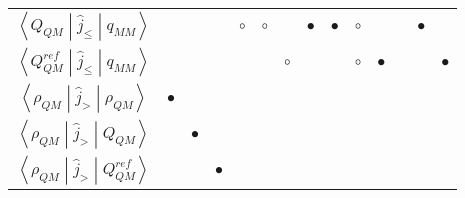 \documentclass{article}
\begin{document}
\begin{table}[tbp]
\begin{threeparttable}
\begin{tabular}{cccccccccccccc}
\rowcolor{Gray}
$\left< Q_{QM} \middle| \hat{j}_{\leq} \middle| q_{MM} \right>$           &                     &                        &                                     & $\circ$                                                                                                                  & $\circ$                &                                     & $\bullet$                                         & $\bullet$              & $\circ$            &                   &                      & $\bullet$         &                  \\
\rowcolor{Gray}
$\left< Q_{QM}^{ref} \middle| \hat{j}_{\leq} \middle| q_{MM} \right>$     &                     &                        &                                     &                                                                                                                          &                        & $\circ$                             &                                                   &                        & $\circ$            & $\bullet$         &                      &                   & $\bullet$        \\
$\left< \rho_{QM} \middle| \hat{j}_{>} \middle| \rho_{QM} \right>$        & $\bullet$           &                        &                                     &                                                                                                                          &                        &                                     &                                                   &                        &                    &                   &                      &                   &                  \\
$\left< \rho_{QM} \middle| \hat{j}_{>} \middle| Q_{QM} \right>$           &                     & $\bullet$              &                                     &                                                                                                                          &                        &                                     &                                                   &                        &                    &                   &                      &                   &                  \\
$\left< \rho_{QM} \middle| \hat{j}_{>} \middle| Q_{QM}^{ref} \right>$     &                     &                        & $\bullet$                           &                                                                                                                          &                        &                                     &                                                   &                        &                    &                   &                      &                   &                  \\

\end{tabular}
\end{threeparttable}
\end{table}
\end{document}
